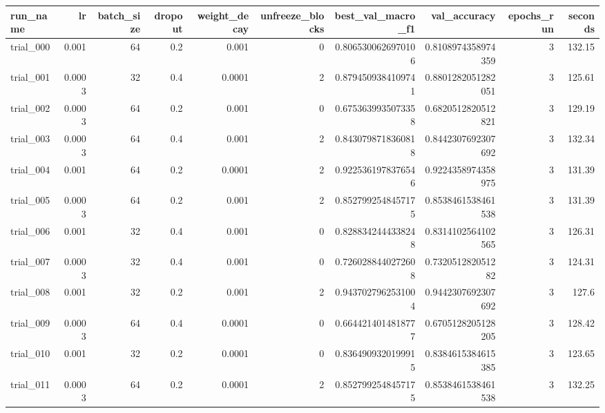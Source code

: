 \begin{tabular}{lrrrrrrrrr}
\hline
run\_name & lr & batch\_size & dropout & weight\_decay & unfreeze\_blocks & best\_val\_macro\_f1 & val\_accuracy & epochs\_run & seconds \\
\hline
trial\_000 & 0.001 & 64 & 0.2 & 0.001 & 0 & 0.8065300626970106 & 0.8108974358974359 & 3 & 132.15 \\
trial\_001 & 0.0003 & 32 & 0.4 & 0.0001 & 2 & 0.8794509384109741 & 0.8801282051282051 & 3 & 125.61 \\
trial\_002 & 0.0003 & 64 & 0.2 & 0.001 & 0 & 0.6753639935073358 & 0.6820512820512821 & 3 & 129.19 \\
trial\_003 & 0.0003 & 64 & 0.4 & 0.001 & 2 & 0.8430798718360818 & 0.8442307692307692 & 3 & 132.34 \\
trial\_004 & 0.001 & 64 & 0.2 & 0.0001 & 2 & 0.9225361978376546 & 0.9224358974358975 & 3 & 131.39 \\
trial\_005 & 0.0003 & 64 & 0.2 & 0.001 & 2 & 0.8527992548457175 & 0.8538461538461538 & 3 & 131.39 \\
trial\_006 & 0.001 & 32 & 0.4 & 0.001 & 0 & 0.8288342444338248 & 0.8314102564102565 & 3 & 126.31 \\
trial\_007 & 0.0003 & 32 & 0.4 & 0.001 & 0 & 0.7260288440272608 & 0.732051282051282 & 3 & 124.31 \\
trial\_008 & 0.001 & 32 & 0.2 & 0.001 & 2 & 0.9437027962531004 & 0.9442307692307692 & 3 & 127.6 \\
trial\_009 & 0.0003 & 64 & 0.4 & 0.0001 & 0 & 0.6644214014818777 & 0.6705128205128205 & 3 & 128.42 \\
trial\_010 & 0.001 & 32 & 0.2 & 0.0001 & 0 & 0.8364909320199915 & 0.8384615384615385 & 3 & 123.65 \\
trial\_011 & 0.0003 & 64 & 0.2 & 0.0001 & 2 & 0.8527992548457175 & 0.8538461538461538 & 3 & 132.25 \\
\hline
\end{tabular}
